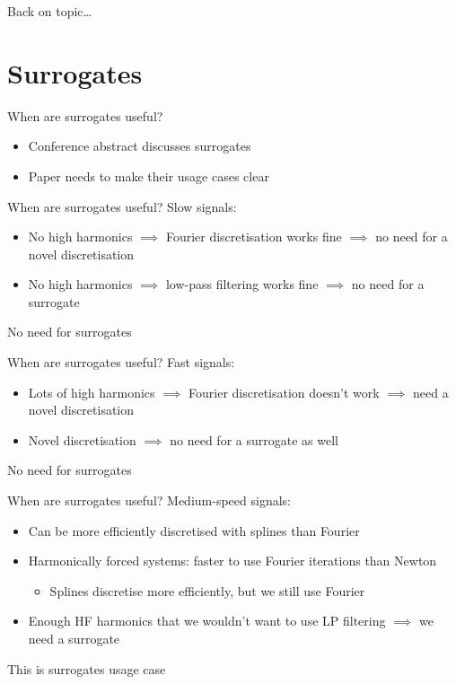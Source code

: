 \documentclass[presentation]{beamer}
\begin{document}
\begin{frame}[label={sec:org85eb5d4}]{}
\begin{center}
Back on topic\ldots{}
\end{center}
\end{frame}

\section{Surrogates}
\label{sec:org598591e}
\begin{frame}[label={sec:orgeb855be}]{When are surrogates useful?}
\begin{itemize}
\item Conference abstract discusses surrogates
\item Paper needs to make their usage cases clear
\end{itemize}
\end{frame}

\begin{frame}[label={sec:org25bf1de}]{When are surrogates useful?}
Slow signals:

\vfill
\begin{itemize}
\item No high harmonics \(\implies\) Fourier discretisation works fine \(\implies\) no need for a novel discretisation
\item No high harmonics \(\implies\) low-pass filtering works fine \(\implies\) no need for a surrogate
\end{itemize}

\vfill
No need for surrogates
\end{frame}
\begin{frame}[label={sec:org303d9eb}]{When are surrogates useful?}
Fast signals:
\vfill
\begin{itemize}
\item Lots of high harmonics \(\implies\) Fourier discretisation doesn't work \(\implies\) need a novel discretisation
\item Novel discretisation \(\implies\) no need for a surrogate as well
\end{itemize}

\vfill
No need for surrogates
\end{frame}

\begin{frame}[label={sec:orge41b66c}]{When are surrogates useful?}
Medium-speed signals:
\vfill
\begin{itemize}
\item Can be more efficiently discretised with splines than Fourier
\item Harmonically forced systems: faster to use Fourier iterations than Newton
\begin{itemize}
\item Splines discretise more efficiently, but we still use Fourier
\end{itemize}
\item Enough HF harmonics that we wouldn't want to use LP filtering \(\implies\) we need a surrogate
\end{itemize}

\vfill
This is surrogates usage case
\end{frame}
\end{document}
